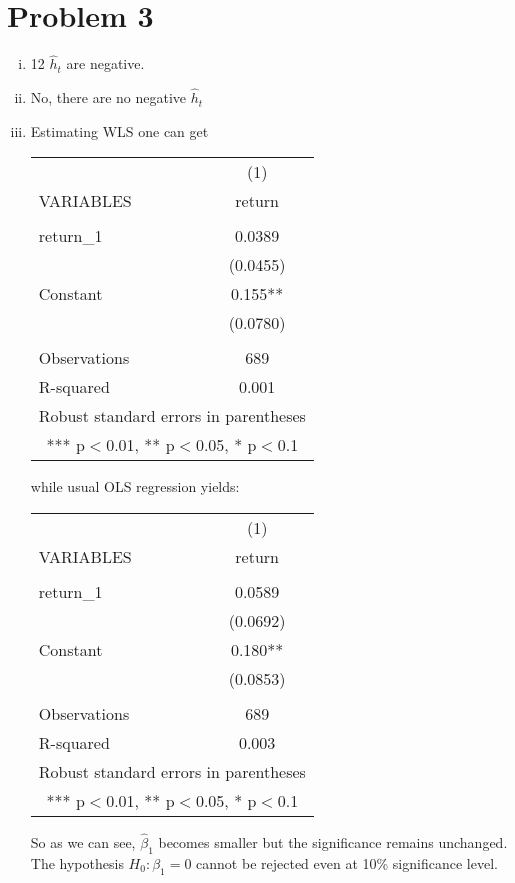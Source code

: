 \documentclass[a4paper]{article}
\begin{document}
\section*{Problem 3}
\begin{enumerate}[(i)]
	\item 12 $\hat{h}_t$ are negative.
	\item No, there are no negative $\hat{h}_t$
	\item Estimating WLS one can get
	\begin{center}
		\begin{tabular}{lc} \hline
			& (1) \\
			VARIABLES & return \\ \hline
			&  \\
			return\_1 & 0.0389 \\
			& (0.0455) \\
			Constant & 0.155** \\
			& (0.0780) \\
			&  \\
			Observations & 689 \\
			R-squared & 0.001 \\ \hline
			\multicolumn{2}{c}{ Robust standard errors in parentheses} \\
			\multicolumn{2}{c}{ *** p$<$0.01, ** p$<$0.05, * p$<$0.1} \\
		\end{tabular}
	\end{center}
while usual OLS regression yields:
\begin{center}
	\begin{tabular}{lc} \hline
		& (1) \\
		VARIABLES & return \\ \hline
		&  \\
		return\_1 & 0.0589 \\
		& (0.0692) \\
		Constant & 0.180** \\
		& (0.0853) \\
		&  \\
		Observations & 689 \\
		R-squared & 0.003 \\ \hline
		\multicolumn{2}{c}{ Robust standard errors in parentheses} \\
		\multicolumn{2}{c}{ *** p$<$0.01, ** p$<$0.05, * p$<$0.1} \\
	\end{tabular}
\end{center}
So as we can see, $\hat{\beta}_1$ becomes smaller but the significance remains unchanged. The hypothesis $H_0: \beta_1 = 0$ cannot be rejected even at 10\% significance level.

\end{enumerate}
\end{document}
